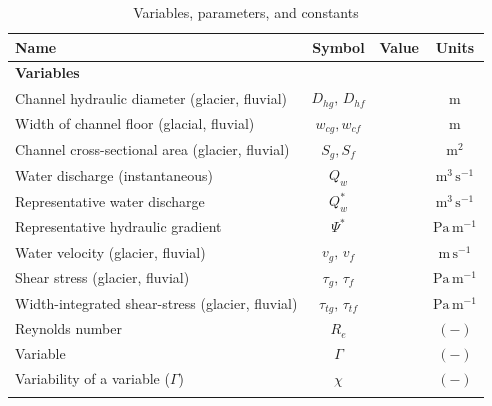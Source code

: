 \documentclass[11pt]{article}
\begin{document}
\begin{spacing}{1}
  \begin{table}[H]
    \centering
    \caption{Variables, parameters, and constants }
    \begin{tabular}{ l  c  c c }
      Name &Symbol&  Value&Units \\ \hline
      \textbf{Variables}  & & & \\
      Channel hydraulic diameter (glacier, fluvial) &  $D_{hg},\,D_{hf}$&  & $\mathrm{m}$     \\
      Width of channel floor (glacial, fluvial) & $w_{cg},w_{cf}$&  & $\mathrm{m}$     \\
      Channel cross-sectional area (glacier, fluvial) &  $S_g, S_f$& & $\mathrm{m^2}$     \\
      Water discharge (instantaneous) & $Q_w$& & $\mathrm{m^{3}\,s^{-1}}$ \\
      Representative water discharge & $Q_{w}^*$& & $\mathrm{m^{3}\,s^{-1}}$ \\
      Representative hydraulic gradient  &$\Psi^*$ & & $\mathrm{Pa\, m^{-1}}$\\
      Water velocity (glacier, fluvial)  & $v_g,\,v_{f}$& & $\mathrm{m\,s^{-1}}$ \\
      Shear stress (glacier, fluvial) & $\tau_g,\,\tau_f$&& $\mathrm{Pa \, m^{-1}}$ \\
      Width-integrated shear-stress (glacier, fluvial) & $\tau_{tg},\, \tau_{tf}$&& $\mathrm{Pa \, m^{-1}}$ \\
      Reynolds number &$R_e$& & $\mathrm{(-)}$\\
      Variable &$\Gamma$&&$\mathrm{(-)}$\\
      Variability of a variable ($\Gamma$) &$\chi$& &$\mathrm{(-)}$\\
           &&&\\


\end{tabular}
\end{table}
\end{spacing}
\end{document}
